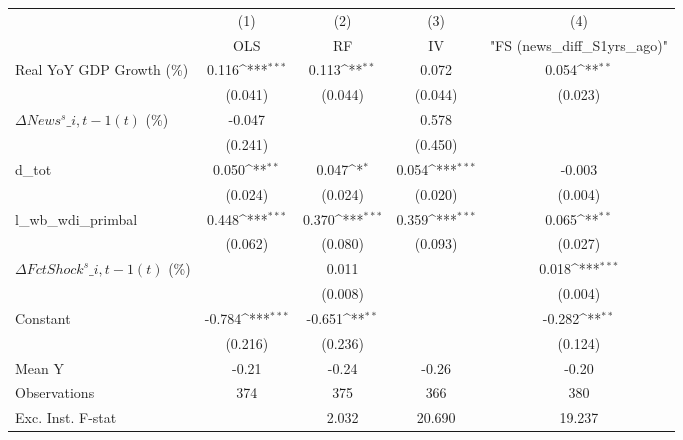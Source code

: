 {
\def\sym#1{\ifmmode^{#1}\else\(^{#1}\)\fi}
\begin{tabular}{l*{4}{c}}
\toprule
                    &\multicolumn{1}{c}{(1)}&\multicolumn{1}{c}{(2)}&\multicolumn{1}{c}{(3)}&\multicolumn{1}{c}{(4)}\\
                    &\multicolumn{1}{c}{OLS}&\multicolumn{1}{c}{RF}&\multicolumn{1}{c}{IV}&\multicolumn{1}{c}{ "FS (news\_diff\_S1yrs\_ago)" }\\
\midrule
Real YoY GDP Growth (\%)&       0.116\sym{***}&       0.113\sym{**} &       0.072         &       0.054\sym{**} \\
                    &     (0.041)         &     (0.044)         &     (0.044)         &     (0.023)         \\
\addlinespace
$ \Delta News^s\_{i,t-1}(t)$ (\%)&      -0.047         &                     &       0.578         &                     \\
                    &     (0.241)         &                     &     (0.450)         &                     \\
\addlinespace
d\_tot               &       0.050\sym{**} &       0.047\sym{*}  &       0.054\sym{***}&      -0.003         \\
                    &     (0.024)         &     (0.024)         &     (0.020)         &     (0.004)         \\
\addlinespace
l\_wb\_wdi\_primbal    &       0.448\sym{***}&       0.370\sym{***}&       0.359\sym{***}&       0.065\sym{**} \\
                    &     (0.062)         &     (0.080)         &     (0.093)         &     (0.027)         \\
\addlinespace
$ \Delta FctShock^s\_{i,t-1}(t)$ (\%)&                     &       0.011         &                     &       0.018\sym{***}\\
                    &                     &     (0.008)         &                     &     (0.004)         \\
\addlinespace
Constant            &      -0.784\sym{***}&      -0.651\sym{**} &                     &      -0.282\sym{**} \\
                    &     (0.216)         &     (0.236)         &                     &     (0.124)         \\
\midrule
Mean Y              &       -0.21         &       -0.24         &       -0.26         &       -0.20         \\
Observations        &         374         &         375         &         366         &         380         \\
Exc. Inst. F-stat   &                     &       2.032         &      20.690         &      19.237         \\
\bottomrule
\end{tabular}
}
